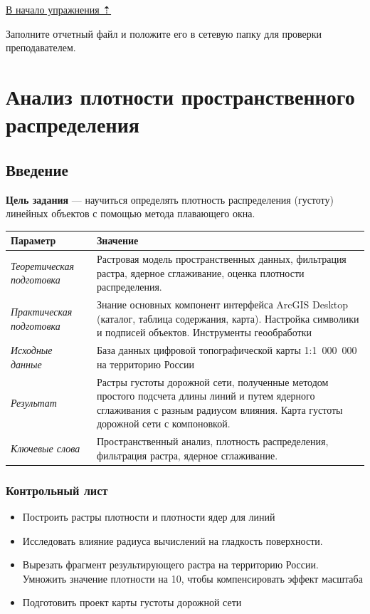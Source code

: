 \documentclass[]{book}
\providecommand{\tightlist}{%
  \setlength{\itemsep}{0pt}\setlength{\parskip}{0pt}}
\theoremstyle{definition}
\theoremstyle{definition}
\theoremstyle{definition}
\theoremstyle{remark}
\begin{document}
\protect\hyperlink{geocoding}{В начало упражнения ⇡}

Заполните отчетный файл и положите его в сетевую папку для проверки
преподавателем.

\hypertarget{density-analysis}{%
\chapter{Анализ плотности пространственного
распределения}\label{density-analysis}}

\hypertarget{density-analysis-intro}{%
\section{Введение}\label{density-analysis-intro}}

\textbf{Цель задания} --- научиться определять плотность распределения
(густоту) линейных объектов с помощью метода плавающего окна.

\begin{longtable}[]{@{}ll@{}}
\toprule
Параметр & Значение\tabularnewline
\midrule
\endhead
\emph{Теоретическая подготовка} & Растровая модель пространственных
данных, фильтрация растра, ядерное сглаживание, оценка плотности
распределения.\tabularnewline
\emph{Практическая подготовка} & Знание основных компонент интерфейса
ArcGIS Desktop (каталог, таблица содержания, карта). Настройка символики
и подписей объектов. Инструменты геообработки\tabularnewline
\emph{Исходные данные} & База данных цифровой топографической карты
1:1~000~000 на территорию России\tabularnewline
\emph{Результат} & Растры густоты дорожной сети, полученные методом
простого подсчета длины линий и путем ядерного сглаживания с разным
радиусом влияния. Карта густоты дорожной сети с
компоновкой.\tabularnewline
\emph{Ключевые слова} & Пространственный анализ, плотность
распределения, фильтрация растра, ядерное сглаживание.\tabularnewline
\bottomrule
\end{longtable}

\hypertarget{density-analysis-control}{%
\subsection{Контрольный лист}\label{density-analysis-control}}

\begin{itemize}
\tightlist
\item
  Построить растры плотности и плотности ядер для линий
\item
  Исследовать влияние радиуса вычислений на гладкость поверхности.
\item
  Вырезать фрагмент результирующего растра на территорию России.
  Умножить значение плотности на 10, чтобы компенсировать эффект
  масштаба
\item
  Подготовить проект карты густоты дорожной сети
\end{itemize}
\end{document}
